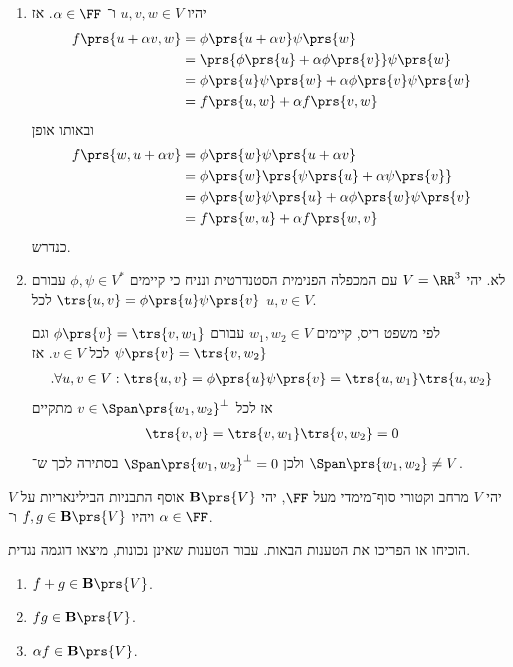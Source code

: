 \documentclass[a4paper,10pt,twoside,openany]{book}
\begin{document}
\begin{solution}
\begin{enumerate}
\item יהיו
$u,v,w \in V$
ו־%
$\alpha \in \FF$.
אז
\begin{align*}
f\prs{u + \alpha v, w} &= \phi\prs{u + \alpha v} \psi\prs{w}
\\&= \prs{\phi\prs{u} + \alpha \phi\prs{v}} \psi\prs{w}
\\&= \phi\prs{u} \psi\prs{w} + \alpha \phi\prs{v} \psi\prs{w}
\\&= f\prs{u, w} + \alpha f\prs{v, w}
\end{align*}
ובאותו אופן
\begin{align*}
f\prs{w, u+\alpha v} &= \phi\prs{w} \psi\prs{u + \alpha v}
\\&= \phi\prs{w} \prs{\psi\prs{u} + \alpha \psi\prs{v}}
\\&= \phi\prs{w} \psi\prs{u} + \alpha \phi\prs{w} \psi\prs{v}
\\&= f\prs{w, u} + \alpha f\prs{w,v}
\end{align*}
כנדרש.

\item לא. יהי
$V = \RR^3$
עם המכפלה הפנימית הסטנדרטית
ונניח כי קיימים
$\phi, \psi \in V^*$
עבורם
$\trs{u,v} = \phi\prs{u} \psi\prs{v}$
לכל
$u,v \in V$.

לפי משפט ריס, קיימים
$w_1, w_2 \in V$
עבורם
$\phi\prs{v} = \trs{v, w_1}$
וגם
$\psi\prs{v} = \trs{v, w_2}$
לכל
$v \in V$.
אז
\begin{align*}
\text{.} \forall u,v \in V: \trs{u,v} = \phi\prs{u} \psi\prs{v} = \trs{u, w_1} \trs{u, w_2}
\end{align*}
אז לכל
$v \in \Span\prs{w_1, w_2}^\perp$
מתקיים
\begin{align*}
\trs{v, v} = \trs{v, w_1} \trs{v, w_2} = 0
\end{align*}
ולכן
$\Span\prs{w_1, w_2}^\perp = 0$
בסתירה לכך ש־%
$\Span\prs{w_1, w_2} \neq V$.
\end{enumerate}
\end{solution}

\begin{exercisechap}
יהי
$V$
מרחב וקטורי סוף־מימדי מעל
$\FF$,
יהי
$\mathbf{B}\prs{V}$
אוסף התבניות הבילינאריות על
$V$
ויהיו
$f,g \in \mathbf{B}\prs{V}$
ו־%
$\alpha \in \FF$.

הוכיחו או הפריכו את הטענות הבאות. עבור הטענות שאינן נכונות, מיצאו דוגמה נגדית.

\begin{enumerate}
\item $f+g \in \mathbf{B}\prs{V}$.

\item $fg \in \mathbf{B}\prs{V}$.

\item $\alpha f \in \mathbf{B}\prs{V}$.
\end{enumerate}
\end{exercisechap}
\end{document}
